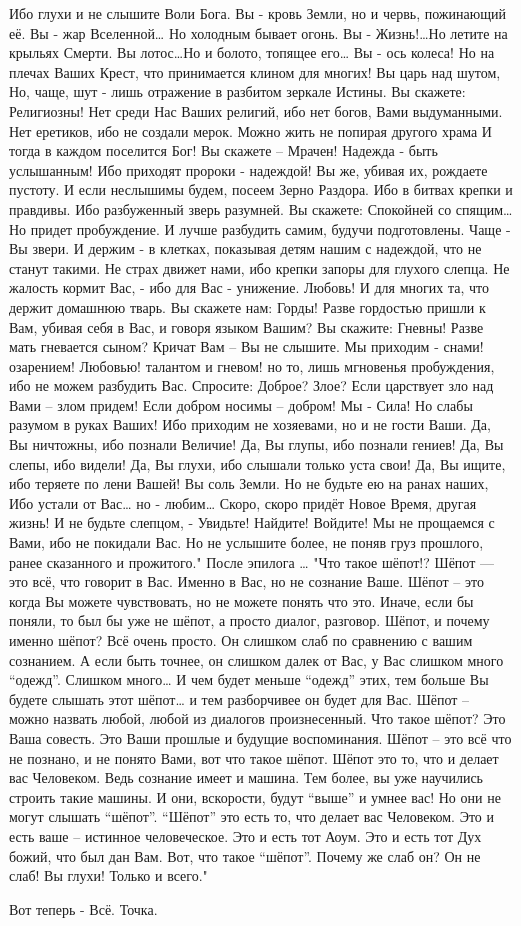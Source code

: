 Ибо глухи и не слышите Воли Бога. 
Вы - кровь Земли, 
но и червь, пожинающий её. 
Вы - жар Вселенной… Но холодным бывает огонь. 
Вы - Жизнь!…Но летите на крыльях Смерти. 
Вы лотос…Но и болото, топящее его… 
Вы  - ось колеса! Но на плечах Ваших Крест, 
что принимается клином для многих! 
Вы царь над шутом, 
Но, чаще, шут  - лишь отражение 
в разбитом зеркале Истины. 
Вы скажете: Религиозны! 
Нет среди Нас Ваших религий, 
ибо нет богов, Вами выдуманными. 
Нет еретиков, ибо не создали мерок. 
Можно жить не попирая другого храма 
И тогда в каждом поселится Бог! 
Вы скажете – Мрачен! 
Надежда - быть услышанным! 
Ибо приходят пророки -  надеждой! 
Вы же, убивая их, рождаете пустоту. 
И если неслышимы будем, 
посеем Зерно Раздора. 
Ибо в битвах крепки и правдивы. 
Ибо разбуженный зверь разумней. 
Вы скажете: Спокойней со спящим… 
Но придет пробуждение. 
И лучше разбудить самим, будучи подготовлены. 
Чаще - Вы звери. И держим - в клетках, 
показывая детям нашим с надеждой, 
что не станут такими. 
Не страх движет нами, 
ибо крепки запоры для глухого слепца. 
Не жалость кормит Вас, - ибо для Вас - унижение. 
Любовь! 
И для многих та, что держит домашнюю тварь. 
Вы скажете нам: Горды! 
Разве гордостью пришли к Вам, 
убивая себя в Вас, 
и говоря языком Вашим? 
Вы скажите: Гневны! 
Разве мать гневается сыном? 
Кричат Вам –  Вы не слышите. 
Мы приходим  - снами! озарением! 
Любовью! талантом и гневом! 
но то, лишь мгновенья пробуждения, 
ибо не можем разбудить Вас. 
Спросите: Доброе? Злое? 
Если царствует зло над Вами – злом придем! 
Если добром носимы – добром! 
Мы - Сила! Но слабы разумом в руках Ваших! 
Ибо приходим не хозяевами, 
но и не гости Ваши. 
Да, Вы ничтожны, ибо познали Величие! 
Да, Вы глупы, ибо познали гениев! 
Да, Вы слепы, ибо видели! 
Да, Вы глухи, ибо слышали только уста свои! 
Да, Вы ищите, ибо теряете по лени Вашей! 
Вы соль Земли. 
Но не будьте ею на ранах наших, 
Ибо устали от Вас… но - любим… 
Скоро, скоро придёт Новое Время, другая жизнь! 
И не будьте слепцом, - Увидьте! Найдите! Войдите! 
Мы не прощаемся с Вами, ибо не покидали Вас. 
Но не услышите более, не поняв груз прошлого, 
ранее сказанного и прожитого."
После эпилога …
"Что такое шёпот!? Шёпот — это всё, что говорит в Вас. Именно в Вас, но не сознание Ваше. Шёпот – это когда Вы можете чувствовать, но не можете понять что это. Иначе, если бы поняли, то был бы уже не шёпот, а просто диалог, разговор. Шёпот, и почему именно шёпот? Всё очень просто. Он слишком слаб по сравнению с вашим сознанием. А если быть точнее, он слишком далек от Вас, у Вас слишком много ``одежд''. Слишком много… И чем будет меньше ``одежд'' этих, тем больше Вы будете слышать этот шёпот… и тем разборчивее он будет для Вас. Шёпот – можно назвать любой, любой из диалогов произнесенный. Что такое шёпот? Это Ваша совесть. Это Ваши прошлые и будущие воспоминания. Шёпот – это всё что не познано, и не понято Вами, вот что такое шёпот. Шёпот это то, что и делает вас Человеком. Ведь сознание имеет и машина. Тем более, вы уже научились строить такие машины. И они, вскорости, будут ``выше'' и умнее вас! Но они не могут слышать ``шёпот''. ``Шёпот'' это есть то, что делает вас Человеком. Это и есть ваше – истинное человеческое. Это и есть тот Аоум. Это и есть тот Дух божий, что был дан Вам. Вот, что такое ``шёпот''. Почему же слаб он? Он не слаб! Вы глухи! Только и всего."
 
Вот теперь - Всё. Точка.